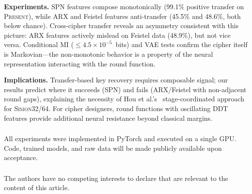 \documentclass[runningheads]{llncs}
\newcommand{\simon}{\textsc{Simon32/64}}
\newcommand{\present}{\textsc{Present}}
\begin{document}
\textbf{Experiments.}
SPN features compose monotonically (99.1\% positive transfer on \present), while ARX and Feistel features anti-transfer (45.5\% and 48.6\%, both below chance).
Cross-cipher transfer reveals an asymmetry consistent with this picture: ARX features actively mislead on Feistel data (48.9\%), but not vice versa.
Conditional MI ($\leq 4.5{\times}10^{-5}$~bits) and VAE tests confirm the cipher itself is Markovian---the non-monotonic behavior is a property of the neural representation interacting with the round function.

\textbf{Implications.}
Transfer-based key recovery requires composable signal; our results predict where it succeeds (SPN) and fails (ARX/Feistel with non-adjacent round gaps), explaining the necessity of Hou et al.'s~\cite{hou2025bayesian} stage-coordinated approach for \simon.
For cipher designers, round functions with oscillating DDT features provide additional neural resistance beyond classical margins.


\begin{credits}
\subsubsection{\ackname}
All experiments were implemented in PyTorch and executed on a single GPU.
Code, trained models, and raw data will be made publicly available upon acceptance.

\subsubsection{\discintname}
The authors have no competing interests to declare that are relevant to the content of this article.
\end{credits}






\appendix
\end{document}
